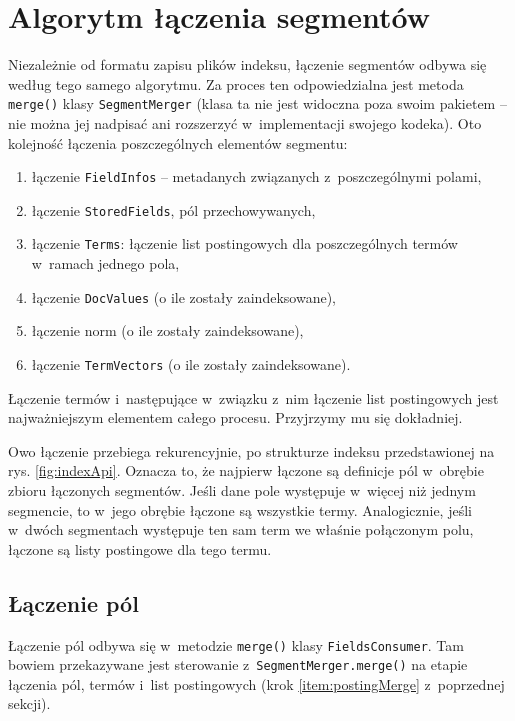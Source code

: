\chapter{Algorytm łączenia segmentów}

Niezależnie od formatu zapisu plików indeksu, łączenie segmentów odbywa się według tego samego algorytmu. Za proces ten odpowiedzialna jest metoda \texttt{merge()} klasy \texttt{SegmentMerger} (klasa ta nie jest widoczna poza swoim pakietem -- nie można jej nadpisać ani rozszerzyć w~implementacji swojego kodeka). Oto kolejność łączenia poszczególnych elementów segmentu:
\begin{enumerate}
 \item łączenie \texttt{FieldInfos} -- metadanych związanych z~poszczególnymi polami,
 \item łączenie \texttt{StoredFields}, pól przechowywanych,
 \item \label{item:postingMerge} łączenie \texttt{Terms}: łączenie list postingowych dla poszczególnych termów w~ramach jednego pola,
 \item łączenie \texttt{DocValues} (o ile zostały zaindeksowane),
 \item łączenie norm (o ile zostały zaindeksowane),
 \item łączenie \texttt{TermVectors} (o ile zostały zaindeksowane).
\end{enumerate}

%
Łączenie termów i~następujące w~związku z~nim łączenie list postingowych jest najważniejszym elementem całego procesu. Przyjrzymy mu się dokładniej.

Owo łączenie przebiega rekurencyjnie, po strukturze indeksu przedstawionej na rys. \ref{fig:indexApi}. Oznacza to, że najpierw łączone są definicje pól w~obrębie zbioru łączonych segmentów. Jeśli dane pole występuje w~więcej niż jednym segmencie, to w~jego obrębie łączone są wszystkie termy. Analogicznie, jeśli w~dwóch segmentach występuje ten sam term we właśnie połączonym polu, łączone są listy postingowe dla tego termu.

\section{Łączenie pól}

Łączenie pól odbywa się w~metodzie \texttt{merge()} klasy \texttt{FieldsConsumer}. Tam bowiem przekazywane jest sterowanie z~\texttt{SegmentMerger.merge()} na etapie łączenia pól, termów i~list postingowych (krok \ref{item:postingMerge} z~poprzednej sekcji). 

